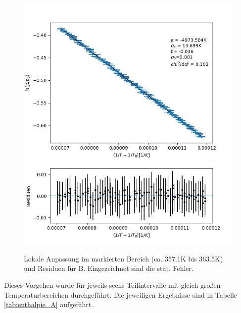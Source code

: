 \documentclass[12pt,a4paper]{article}
\begin{document}
\begin{figure}[H]
\begin{center}
\includegraphics[width=0.9\linewidth]{Bilder/lokaler_fit_2B}\\
\includegraphics[width=0.9\linewidth]{Bilder/lokale_residuen_2B}
\caption[Lokale Anpassung]{Lokale Anpassung im markierten Bereich (ca. 357.1K bis 363.5K) und Residuen für B. Eingezeichnet sind die stat. Fehler.}
\label{fig:fit_2B}
\end{center}
\end{figure}


Dieses Vorgehen wurde für jeweils sechs Teilintervalle mit gleich großen Temperaturbereichen durchgeführt. Die jeweiligen Ergebnisse sind in Tabelle \ref{tab:enthalpie_A}
aufgeführt.\\
\end{document}
